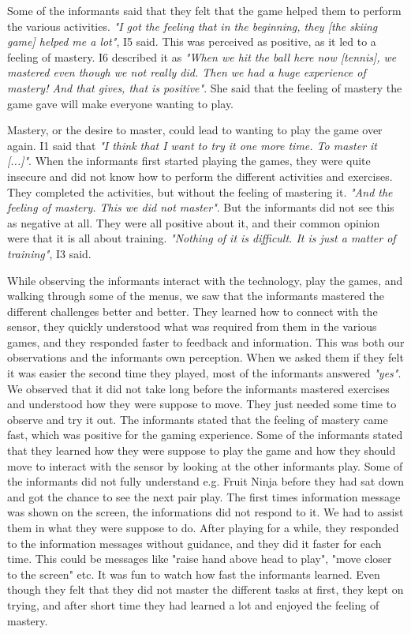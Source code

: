 Some of the informants said that they felt that the game helped them to perform the various activities. \emph{"I got the feeling that in the beginning, they [the skiing game] helped me a lot"}, I5 said. This was perceived as positive, as it led to a feeling of mastery. I6 described it as \emph{"When we hit the ball here now [tennis], we mastered even though we not really did. Then we had a huge experience of mastery! And that gives, that is positive"}. She said that the feeling of mastery the game gave will make everyone wanting to play.  

Mastery, or the desire to master, could lead to wanting to play the game over again. I1 said that \emph{"I think that I want to try it one more time. To master it [...]"}. When the informants first started playing the games, they were quite insecure and did not know how to perform the different activities and exercises. They completed the activities, but without the feeling of mastering it. \emph{"And the feeling of mastery. This we did not master"}. But the informants did not see this as negative at all. They were all positive about it, and their common opinion were that it is all about training. \emph{"Nothing of it is difficult. It is just a matter of training"}, I3 said. 

While observing the informants interact with the technology, play the games, and walking through some of the menus, we saw that the informants mastered the different challenges better and better. They learned how to connect with the sensor, they quickly understood what was required from them in the various games, and they responded faster to feedback and information. This was both our observations and the informants own perception. When we asked them if they felt it was easier the second time they played, most of the informants answered \emph{"yes"}. We observed that it did not take long before the informants mastered exercises and understood how they were suppose to move. They just needed some time to observe and try it out. The informants stated that the feeling of mastery came fast, which was positive for the gaming experience. Some of the informants stated that they learned how they were suppose to play the game and how they should move to interact with the sensor by looking at the other informants play. Some of the informants did not fully understand e.g. Fruit Ninja before they had sat down and got the chance to see the next pair play. The first times information message was shown on the screen, the informations did not respond to it. We had to assist them in what they were suppose to do. After playing for a while, they responded to the information messages without guidance, and they did it faster for each time. This could be messages like "raise hand above head to play", "move closer to the screen" etc. It was fun to watch how fast the informants learned. Even though they felt that they did not master the different tasks at first, they kept on trying, and after short time they had learned a lot and enjoyed the feeling of mastery. 

